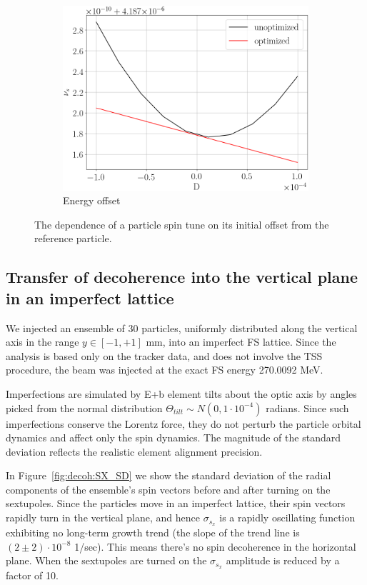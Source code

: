 \begin{figure}[!h]\ContinuedFloat\centering
	\begin{subfigure}{\linewidth}
		\includegraphics[height=.35\paperheight]{images/decoh_sim/spin_tune_decoh_d_offset}
		\caption{Energy offset}
	\end{subfigure}
	\caption{The dependence of a particle spin tune on its initial offset
          from the reference particle.\label{fig:decoh:perfect}}
\end{figure}

\subsection{Transfer of decoherence into the vertical plane in an imperfect lattice}
We injected an ensemble of 30 particles, uniformly distributed along the vertical axis in the range
$y \in [-1, +1]$ mm, into an imperfect FS lattice. Since the analysis is based only on the tracker data,
and does not involve the TSS procedure, the beam was injected at the exact FS energy 270.0092 MeV.

Imperfections are simulated by E+b element tilts about the optic axis by angles picked from the normal
distribution $\Theta_{tilt} \sim N(0, 1\cdot 10^{-4})$ radians. Since such imperfections conserve the
Lorentz force, they do not perturb the particle orbital dynamics and affect only the spin dynamics.
The magnitude of the standard deviation reflects the realistic element alignment precision.

In Figure~\ref{fig:decoh:SX_SD} we show the standard deviation of the radial components of
the ensemble's spin vectors before and after turning on the sextupoles.
Since the particles move in an imperfect lattice, their spin vectors rapidly turn in the vertical plane,
and hence $\sigma_{s_x}$ is a rapidly oscillating function exhibiting no long-term growth trend
(the slope of the trend line is $(2\pm2)\cdot 10^{-8}$ 1/sec). This means there's no spin decoherence
in the horizontal plane. When the sextupoles are turned on the $\sigma_{s_x}$ amplitude is reduced by
a factor of 10.

